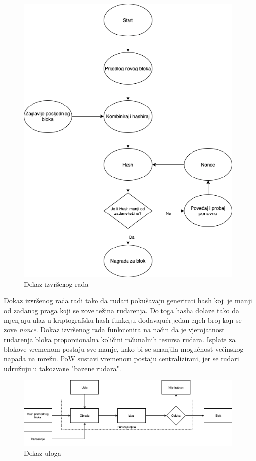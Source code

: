 \documentclass[times, utf8, diplomski]{fer}
\begin{document}
\begin{figure}[htb]
\centering
\includegraphics[width=12cm]{imgs/PoW.png}
\caption{Dokaz izvršenog rada}
\label{fig:pow}
\end{figure}

Dokaz izvršenog rada radi tako da rudari pokušavaju generirati hash koji je manji od zadanog praga koji se zove težina rudarenja. Do toga hasha dolaze tako da mjenjaju ulaz u kriptografsku hash funkciju dodavajući jedan cijeli broj koji se zove \textit{nonce}.  Dokaz izvršenog rada funkcionira na način da je vjerojatnost rudarenja bloka proporcionalna količini računalnih resursa rudara. Isplate za blokove vremenom postaju sve manje, kako bi se smanjila mogućnost većinskog napada na mrežu. PoW sustavi vremenom postaju centralizirani, jer se rudari udružuju u takozvane "bazene rudara".

\begin{figure}[htb]
\centering
\includegraphics[width=12cm]{imgs/PoS.png}
\caption{Dokaz uloga}
\label{fig:pos}
\end{figure}
\end{document}
